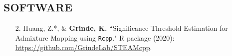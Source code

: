 \documentclass[margin]{res}
\begin{document}
\begin{resume}
%



\section{SOFTWARE} 

\begin{itemize}
\item[2.] Huang, Z.*, \& \textbf{Grinde, K.} ``Significance Threshold Estimation for Admixture Mapping using \texttt{Rcpp}." R package (2020): \href{https://github.com/GrindeLab/STEAMcpp}{https://github.com/GrindeLab/STEAMcpp}.


\end{itemize}
\end{resume}
\end{document}
